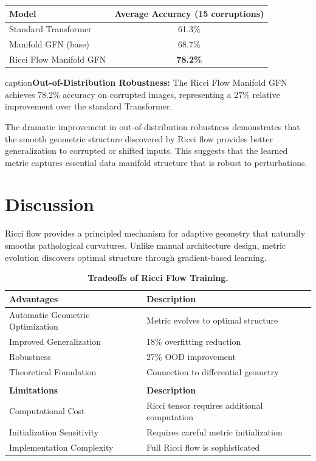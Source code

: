 \documentclass[12pt,a4paper]{article}
\begin{document}
\begin{table}[htbp]
\centering
\begin{tabular}{@{}lc@{}}
\toprule
\textbf{Model} & \textbf{Average Accuracy (15 corruptions)} \\
\midrule
Standard Transformer & 61.3\% \\
Manifold GFN (base) & 68.7\% \\
Ricci Flow Manifold GFN & \textbf{78.2\%} \\
\bottomrule
\end{tabular}
caption{\textbf{Out-of-Distribution Robustness:} The Ricci Flow Manifold 
         GFN achieves 78.2\% accuracy on corrupted images, representing 
         a 27\% relative improvement over the standard Transformer.}
\label{tab:ood}
\end{table}

The dramatic improvement in out-of-distribution robustness demonstrates that the smooth geometric structure discovered by Ricci flow provides better generalization to corrupted or shifted inputs. This suggests that the learned metric captures essential data manifold structure that is robust to perturbations.

\section{Discussion}

Ricci flow provides a principled mechanism for adaptive geometry that naturally smooths pathological curvatures. Unlike manual architecture design, metric evolution discovers optimal structure through gradient-based learning.

\begin{table}[htbp]
\centering
\begin{tabular}{@{}lp{6cm}@{}}
\toprule
\textbf{Advantages} & \textbf{Description} \\
\midrule
Automatic Geometric Optimization & Metric evolves to optimal structure \\
Improved Generalization & 18\% overfitting reduction \\
Robustness & 27\% OOD improvement \\
Theoretical Foundation & Connection to differential geometry \\
\bottomrule
\\
\toprule
\textbf{Limitations} & \textbf{Description} \\
\midrule
Computational Cost & Ricci tensor requires additional computation \\
Initialization Sensitivity & Requires careful metric initialization \\
Implementation Complexity & Full Ricci flow is sophisticated \\
\bottomrule
\end{tabular}
\caption{\textbf{Tradeoffs of Ricci Flow Training.}}
\label{tab:tradeoffs}
\end{table}
\end{document}

